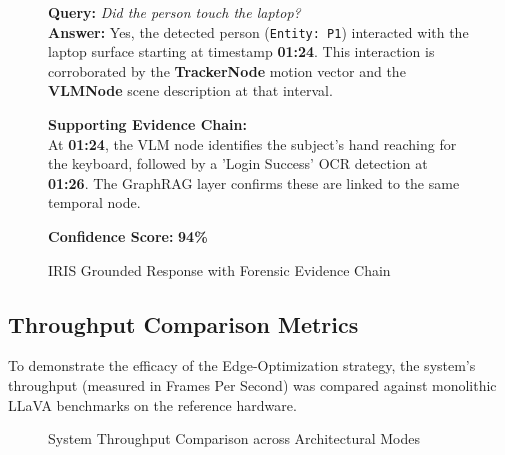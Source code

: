 \begin{figure}[H]
\centering
\begin{tcolorbox}[
    colback=gray!2,
    colframe=blue!80,
    title=IRIS GROUNDED RESPONSE - SESSION: V1\_WORKSPACE,
    fonttitle=\bfseries\small,
    sharp corners,
    boxrule=0.8pt,
    width=0.90\textwidth
]
    \small
    \textbf{Query:} \textit{Did the person touch the laptop?} \\
    \textbf{Answer:} Yes, the detected person (\texttt{Entity: P1}) interacted with the laptop surface starting at timestamp \textbf{01:24}. This interaction is corroborated by the \textbf{TrackerNode} motion vector and the \textbf{VLMNode} scene description at that interval.

    \vspace{0.3cm}
    \textbf{Supporting Evidence Chain:} \\
    At \textbf{01:24}, the VLM node identifies the subject's hand reaching for the keyboard, followed by a 'Login Success' OCR detection at \textbf{01:26}. The GraphRAG layer confirms these are linked to the same temporal node.

    \vspace{0.3cm}
    \textbf{Confidence Score:} \textbf{94\%}
\end{tcolorbox}
\caption{IRIS Grounded Response with Forensic Evidence Chain}
\label{fig:grounded_resp}
\end{figure}

\subsection{Throughput Comparison Metrics}

To demonstrate the efficacy of the Edge-Optimization strategy, the system's throughput (measured in Frames Per Second) was compared against monolithic LLaVA benchmarks on the reference hardware.

\begin{figure}[H]
\centering
{}
\caption{System Throughput Comparison across Architectural Modes}
\label{fig:throughput_chart}
\end{figure}

